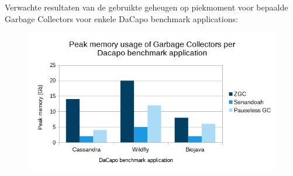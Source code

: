 \begin{graph2section}
    Verwachte resultaten van de gebruikte geheugen op piekmoment voor bepaalde Garbage Collectors voor enkele DaCapo benchmark applications:
    \begin{figure}[h]
        \centering
        \includegraphics[width=1\columnwidth]{img/graph3.png}
    \end{figure}
\end{graph2section}



